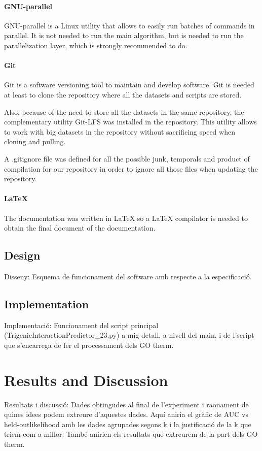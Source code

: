 \documentclass[11pt]{article}
\begin{document}
      \paragraph{GNU-parallel}
      GNU-parallel is a Linux utility that allows to easily run batches of commands in parallel. It is not needed to run the main algorithm, but is needed to run the parallelization layer, which is strongly recommended to do.
      \paragraph{Git}
      Git is a software versioning tool to maintain and develop software. Git is needed at least to clone the repository where all the datasets and scripts are stored. 
      \par
      Also, because of the need to store all the datasets in the same repository, the complementary utility Git-LFS was installed in the repository. This utility allows to work with big datasets in the repository without sacrificing speed when cloning and pulling.
      \par 
      A .gitignore file was defined for all the possible junk, temporals and product of compilation for our repository in order to ignore all those files when updating the repository.
      \paragraph{LaTeX}
      The documentation was written in LaTeX so a LaTeX compilator is needed to obtain the final document of the documentation.

  \subsection{Design}
  Disseny: Esquema de funcionament del software amb respecte a la especificació.

  \subsection{Implementation}
  Implementació: Funcionament del script principal (TrigenicInteractionPredictor\_23.py) a mig detall, a nivell del main, i de l'script que s'encarrega de fer el processament dels GO therm.

\section{Results and Discussion}
Resultats i discussió: Dades obtingudes al final de l'experiment i raonament de quines idees podem extreure d'aquestes dades. Aquí aniria el gràfic de AUC vs held-outlikelihood amb les dades agrupades segons k i la justificació de la k que triem com a millor. També anirien els resultats que extreurem de la part dels GO therm.
\end{document}
